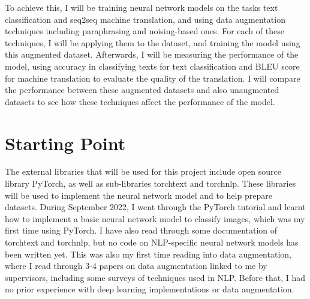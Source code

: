 \documentclass[60pt]{article}
\begin{document}
To achieve this, I will be training neural network models on the tasks text classification and seq2seq machine translation, and using data augmentation techniques including paraphrasing and noising-based ones. For each of these techniques, I will be applying them to the dataset, and training the model using this augmented dataset. Afterwards, I will be measuring the performance of the model, using accuracy in classifying texts for text classification and BLEU score \cite{papineni-etal-2002-bleu} for machine translation to evaluate the quality of the translation. I will compare the performance between these augmented datasets and also unaugmented datasets to see how these techniques affect the performance of the model.

\section{Starting Point}
\par
The external libraries that will be used for this project include open source library PyTorch, as well as sub-libraries torchtext and torchnlp. These libraries will be used to implement the neural network model and to help prepare datasets. During September 2022, I went through the PyTorch tutorial and learnt how to implement a basic neural network model to classify images, which was my first time using PyTorch. I have also read through some documentation of torchtext and torchnlp, but no code on NLP-specific neural network models has been written yet. This was also my first time reading into data augmentation, where I read through 3-4 papers on data augmentation linked to me by supervisors, including some surveys of techniques used in NLP. Before that, I had no prior experience with deep learning implementations or data augmentation.
\end{document}
